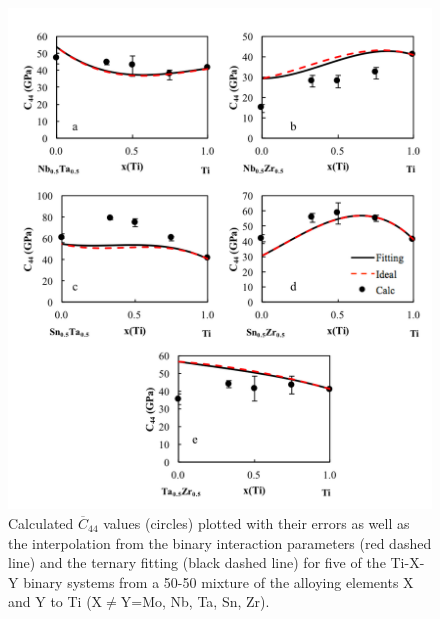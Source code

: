 \pagebreak
\begin{figure}[H]
	\centering
	\includegraphics[width=\textwidth]{Chapter-6/Figures/tixyc44_2.png}
	\caption{Calculated $\overline{C}_{44}$ values (circles) plotted with their errors as well as the interpolation from the binary interaction parameters (red dashed line) and the ternary fitting (black dashed line) for five of the Ti-X-Y binary systems from a 50-50 mixture of the alloying elements X and Y to Ti (X$\neq$Y=Mo, Nb, Ta, Sn, Zr).}
	\label{Ch6-figure:tixyc44_2}
\end{figure}

